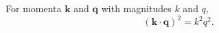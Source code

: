\documentclass{article}
\begin{document}
For momenta $\mathbf{k}$ and $\mathbf{q}$ with magnitudes $k$ and $q$,
\begin{equation}
(\mathbf{k}\cdot\mathbf{q})^2 = k^2 q^2 .
\label{eq:kq}
\end{equation}
\end{document}
